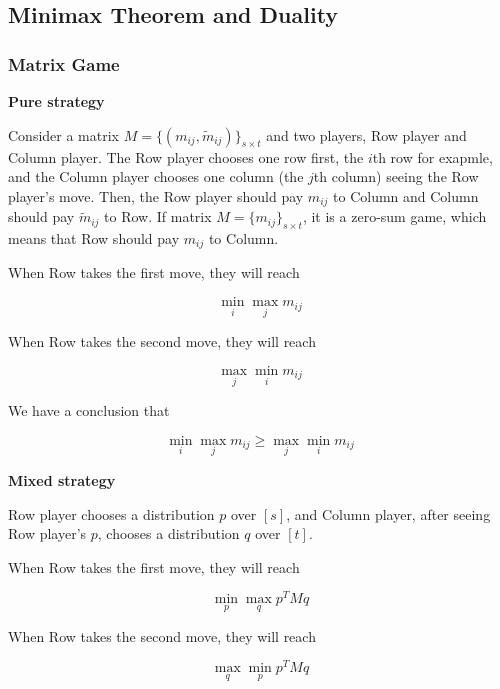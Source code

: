 \documentclass[UTF8]{article}
\begin{document}
\subsection{Minimax Theorem and Duality}
\subsubsection{Matrix Game}
\textbf{Pure strategy}\par
\vspace{9pt}
Consider a matrix $M=\{(m_{ij},\tilde{m}_{ij})\}_{s\times t}$ and two players, Row player and Column player. The Row player chooses one row first, the $i$th row for exapmle, and the Column player chooses one column (the $j$th column) seeing the Row player's move. Then, the Row player should pay $m_{ij}$ to Column and Column should pay $\tilde{m}_{ij}$ to Row. If matrix $M=\{m_{ij}\}_{s\times t}$, it is a zero-sum game, which means that Row should pay $m_{ij}$ to Column.\par
When Row takes the first move, they will reach\par
\begin{equation*}
\min_{i}\max_{j} m_{ij}
\end{equation*}\par
When Row takes the second move, they will reach\par
\begin{equation*}
\max_{j}\min_{i} m_{ij}
\end{equation*}\par
We have a conclusion that\par
\begin{equation*}
\min_{i}\max_{j} m_{ij}\geq\max_{j}\min_{i} m_{ij}
\end{equation*}\par
\textbf{Mixed strategy}\par
\vspace{9pt}
Row player chooses a distribution $p$ over $[s]$, and Column player, after seeing Row player's $p$, chooses a distribution $q$ over $[t]$.\par
When Row takes the first move, they will reach\par
\begin{equation*}
\min_{p}\max_{q}p^{T}Mq
\end{equation*}\par
When Row takes the second move, they will reach\par
\begin{equation*}
\max_{q}\min_{p}p^{T}Mq
\end{equation*}\par
\end{document}
